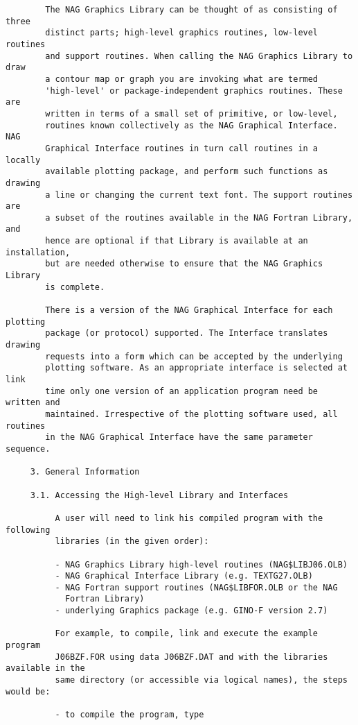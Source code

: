 \begin{verbatim}
        The NAG Graphics Library can be thought of as consisting of three
        distinct parts; high-level graphics routines, low-level routines
        and support routines. When calling the NAG Graphics Library to draw
        a contour map or graph you are invoking what are termed
        'high-level' or package-independent graphics routines. These are
        written in terms of a small set of primitive, or low-level,
        routines known collectively as the NAG Graphical Interface. NAG
        Graphical Interface routines in turn call routines in a locally
        available plotting package, and perform such functions as drawing
        a line or changing the current text font. The support routines are
        a subset of the routines available in the NAG Fortran Library, and
        hence are optional if that Library is available at an installation,
        but are needed otherwise to ensure that the NAG Graphics Library
        is complete.
     
        There is a version of the NAG Graphical Interface for each plotting
        package (or protocol) supported. The Interface translates drawing
        requests into a form which can be accepted by the underlying
        plotting software. As an appropriate interface is selected at link
        time only one version of an application program need be written and
        maintained. Irrespective of the plotting software used, all routines
        in the NAG Graphical Interface have the same parameter sequence.
     
     3. General Information
     
     3.1. Accessing the High-level Library and Interfaces
     
          A user will need to link his compiled program with the following
          libraries (in the given order):
     
          - NAG Graphics Library high-level routines (NAG$LIBJ06.OLB)
          - NAG Graphical Interface Library (e.g. TEXTG27.OLB)
          - NAG Fortran support routines (NAG$LIBFOR.OLB or the NAG
            Fortran Library)
          - underlying Graphics package (e.g. GINO-F version 2.7)
     
          For example, to compile, link and execute the example program
          J06BZF.FOR using data J06BZF.DAT and with the libraries available in the
          same directory (or accessible via logical names), the steps would be:

          - to compile the program, type
     

\end{verbatim}
